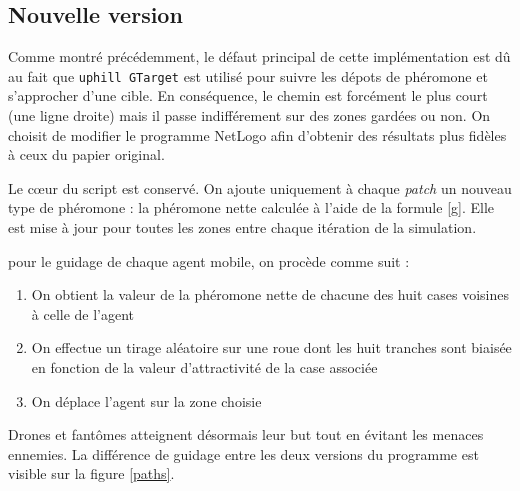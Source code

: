 \documentclass[12pt]{article}
\begin{document}
\subsection{Nouvelle version}

Comme montré précédemment, le défaut principal de cette implémentation
est dû au fait que \texttt{uphill GTarget} est utilisé pour suivre les
dépots de phéromone et s'approcher d'une cible. En conséquence, le
chemin est forcément le plus court (une ligne droite) mais il passe
indifférement sur des zones gardées ou non. On choisit de modifier le
programme NetLogo afin d'obtenir des résultats plus fidèles à ceux du
papier original.

Le c\oe ur du script est conservé. On ajoute uniquement à chaque
\textit{patch} un nouveau type de phéromone : la phéromone nette
calculée à l'aide de la formule \ref{g}. Elle est mise à jour pour
toutes les zones entre chaque itération de la simulation.

pour le guidage de chaque agent mobile, on procède comme suit :

\begin{enumerate}
  \item{On obtient la valeur de la phéromone nette de chacune des huit
  cases voisines à celle de l'agent}
  \item{On effectue un tirage aléatoire sur une roue dont les huit tranches
  sont biaisée en fonction de la valeur d'attractivité de la case
  associée}
  \item{On déplace l'agent sur la zone choisie}
\end{enumerate}

Drones et fantômes atteignent désormais leur but tout en évitant les
menaces ennemies. La différence de guidage entre les deux versions du
programme est visible sur la figure \ref{paths}.
\end{document}
